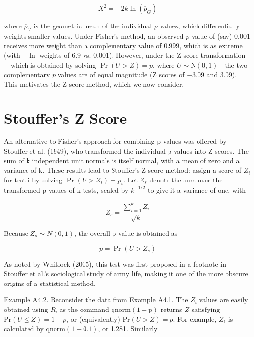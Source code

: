 \documentclass{article}
\begin{document}
\begin{equation}
X^{2}=-2k\ln(\overline{p}_{G})
\end{equation}

where  $ \overline{p}_G $ is the geometric mean of the individual  $ p $ values, which differentially weights smaller values. Under Fisher’s method, an observed  $ p $ value of (say) 0.001 receives more weight than a complementary value of 0.999, which is as extreme (with  $ -\ln $ weights of 6.9 vs. 0.001). However, under the Z-score transformation—which is obtained by solving  $ \Pr(U > Z) = p $, where  $ U \sim \mathrm{N}(0,1) $—the two complementary  $ p $ values are of equal magnitude (Z scores of  $ -3.09 $ and  $ 3.09 $). This motivates the Z-score method, which we now consider.

\section{Stouffer's Z Score}
An alternative to Fisher’s approach for combining p values was offered by Stouffer et al. (1949), who transformed the individual p values into Z scores. The sum of k independent unit normals is itself normal, with a mean of zero and a variance of k. These results lead to Stouffer’s Z score method: assign a score of  $ Z_i $ for test i by solving  $ \Pr(U > Z_i) = p_i $. Let  $ Z_s $ denote the sum over the transformed p values of k tests, scaled by  $ k^{-1/2} $ to give it a variance of one, with

\begin{equation}
Z_{s}=\frac{\sum_{i=1}^{k}Z_{i}}{\sqrt{k}}
\end{equation}

Because  $ Z_s \sim N(0,1) $, the overall p value is obtained as

\begin{equation}
p=\Pr(U>Z_{s})
\end{equation}

As noted by Whitlock (2005), this test was first proposed in a footnote in Stouffer et al.'s sociological study of army life, making it one of the more obscure origins of a statistical method.

Example A4.2. Reconsider the data from Example A4.1. The  $ Z_i $ values are easily obtained using  $ R $, as the command  $ \text{qnorm}(1-\text{p}) $ returns  $ Z $ satisfying  $ \text{Pr}(U \leq Z) = 1 - p $, or (equivalently)  $ \text{Pr}(U > Z) = p $. For example,  $ Z_1 $ is calculated by  $ \text{qnorm}(1-0.1) $, or 1.281. Similarly
\end{document}
